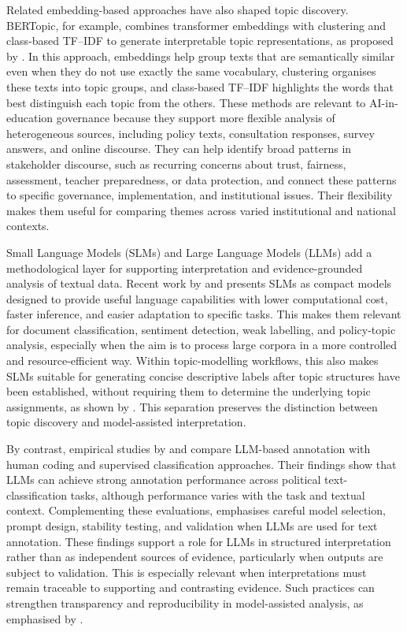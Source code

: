 Related embedding-based approaches have also shaped topic discovery. BERTopic, for
example, combines transformer embeddings with clustering and class-based TF--IDF to
generate interpretable topic representations, as proposed by
\cite{grootendorst2022bertopic}. In this approach, embeddings help group texts that
are semantically similar even when they do not use exactly the same vocabulary,
clustering organises these texts into topic groups, and class-based TF--IDF
highlights the words that best distinguish each topic from the others. These methods
are relevant to AI-in-education governance because they support more flexible
analysis of heterogeneous sources, including policy texts, consultation responses,
survey answers, and online discourse. They can help identify broad patterns in
stakeholder discourse, such as recurring concerns about trust, fairness, assessment,
teacher preparedness, or data protection, and connect these patterns to specific
governance, implementation, and institutional issues. Their flexibility makes them
useful for comparing themes across varied institutional and national contexts.

Small Language Models (SLMs) and Large Language Models (LLMs) add a methodological
layer for supporting interpretation and evidence-grounded analysis of textual data.
Recent work by \cite{lu2024small} and \cite{nguyen2025survey} presents SLMs as
compact models designed to provide useful language capabilities with lower
computational cost, faster inference, and easier adaptation to specific tasks. This
makes them relevant for document classification, sentiment detection, weak labelling,
and policy-topic analysis, especially when the aim is to process large corpora in a
more controlled and resource-efficient way. Within topic-modelling workflows, this
also makes SLMs suitable for generating concise descriptive labels after topic
structures have been established, without requiring them to determine the underlying
topic assignments, as shown by \cite{mekaoui2026semanticlabels}. This separation
preserves the distinction between topic discovery and model-assisted interpretation.

By contrast, empirical studies by \cite{tornberg2025llm} and \cite{heseltine2024llm}
compare LLM-based annotation with human coding and supervised classification
approaches. Their findings show that LLMs can achieve strong annotation performance
across political text-classification tasks, although performance varies with the task
and textual context. Complementing these evaluations,
\cite{tornberg2024bestpractices} emphasises careful model selection, prompt design,
stability testing, and validation when LLMs are used for text annotation. These
findings support a role for LLMs in structured interpretation rather than as
independent sources of evidence, particularly when outputs are subject to validation.
This is especially relevant when interpretations must remain traceable to supporting
and contrasting evidence. Such practices can strengthen transparency and
reproducibility in model-assisted analysis, as emphasised by
\cite{tornberg2024bestpractices}.

